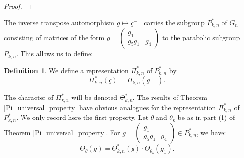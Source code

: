 \documentclass[reqno]{amsart}
\newtheorem{lemma}[theorem]{Lemma}
\theoremstyle{definition}
\newtheorem{definition}[theorem]{Definition}
\theoremstyle{remark}
\newtheorem{remark}[theorem]{Remark}
\numberwithin{equation}{section}
\DeclareMathOperator{\Ind}{Ind}
\newcommand{\bbsm}{\left (\begin{smallmatrix}}      \newcommand{\besm}{\end{smallmatrix}\right )}
\begin{document}
{{\begin{proof}
\end{proof}
The inverse transpose automorphism $g \mapsto g^{-\top}$ carries the subgroup $P^*_{k,n}$ of $G_n$ consisting of matrices of the form $g=\bbsm g_1 & \\g_5g_1 & g_4 \besm$ to the parabolic subgroup $P_{k,n}$. This allows us to define:
\begin{definition} \label{Pi^*_def}
    We define a representation $\Pi^*_{k,n}$ of $P^*_{k,n}$ by 
    \[ \Pi^*_{k,n}(g)=\Pi_{k,n}(g^{-\top}).\]
\end{definition}
The character of $\Pi^*_{k,n}$ will be denoted $\Theta^*_{k,n}$. The results of Theorem
\ref{Pi_universal_property} have obvious analogues for the representation $\Pi^*_{k,n}$ of $P^*_{k,n}$. We only record here the first property. Let $\theta$ and $\theta_k$  be as in part (1) of Theorem \ref{Pi_universal_property}. For $g=\bbsm g_1 & \\g_5 g_1 & g_4 \besm \in P^*_{k,n}$, we have: 
         \begin{equation} \label{eq:Pi*_universal_property}
         \Theta_\theta(g)= \Theta^*_{k,n}(g) \cdot \Theta_{\theta_k}(g_1).
\end{equation}
}}
\end{document}

